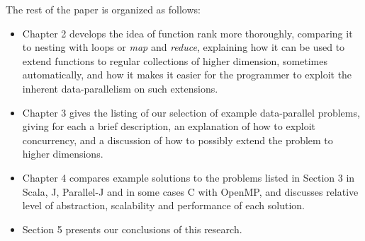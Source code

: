 The rest of the paper is organized as follows:
\begin{itemize}
    \item Chapter 2 develops the idea of function rank more thoroughly, comparing it to nesting with loops or \textit{map} and \textit{reduce}, explaining how it can be used to extend functions to regular collections of higher dimension, sometimes automatically, and how it makes it easier for the programmer to exploit the inherent data-parallelism on such extensions. 
    \item Chapter 3 gives the listing of our selection of example data-parallel problems, giving for each a brief description, an explanation of how to exploit concurrency, and a discussion of how to possibly extend the problem to higher dimensions.
    \item Chapter 4 compares example solutions to the problems listed in Section 3 in Scala, J, Parallel-J and in some cases C with OpenMP, and discusses relative level of abstraction, scalability and performance of each solution. 
    \item Section 5 presents our conclusions of this research.
\end{itemize}

\nocite{rankanduni}
\nocite{dph}

\begin{comment}
Data rank is simply the rank of a collection, and scalar values are considered to be collections of rank 0.
Thus, the rank of some regular collection is a non-negative integer.%
Function rank is a rank 1 collection of each of the associated data rank values of a function's expected arguments, usually with some value to represent when the function can take data of any rank for a specific argument.
\end{comment}

